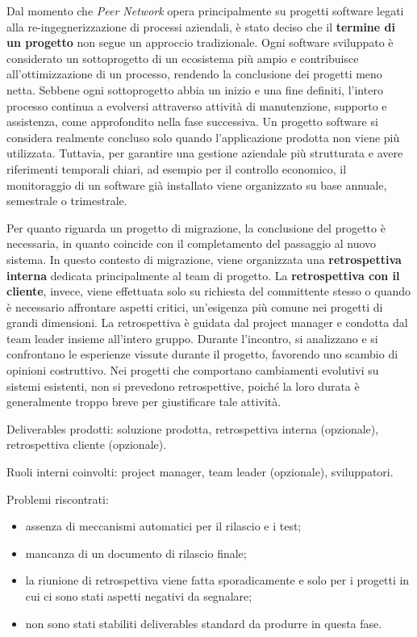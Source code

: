        Dal momento che \textit{Peer Network} opera principalmente su progetti software legati alla re-ingegnerizzazione di processi aziendali, è stato deciso che il \textbf{termine di un progetto}
        non segue un approccio tradizionale. Ogni software sviluppato è considerato un sottoprogetto di un ecosistema più ampio e contribuisce all’ottimizzazione
        di un processo, rendendo la conclusione dei progetti meno netta. Sebbene ogni sottoprogetto abbia un inizio e una fine definiti, l’intero
        processo continua a evolversi attraverso attività di manutenzione, supporto e assistenza, come approfondito nella fase successiva. Un progetto software
        si considera realmente concluso solo quando l'applicazione prodotta non viene più utilizzata. Tuttavia, per garantire una gestione aziendale più strutturata
        e avere riferimenti temporali chiari, ad esempio per il controllo economico, il monitoraggio di un software già installato viene organizzato
        su base annuale, semestrale o trimestrale.
        
        Per quanto riguarda un progetto di migrazione, la conclusione del progetto è necessaria, in quanto coincide con il completamento del passaggio al nuovo sistema.
        In questo contesto di migrazione, viene organizzata una \textbf{retrospettiva
        interna} dedicata principalmente al team di progetto. La \textbf{retrospettiva con il cliente}, invece, viene effettuata solo su richiesta del committente stesso o quando è
        necessario affrontare aspetti critici, un’esigenza più comune nei progetti di grandi dimensioni.
        La retrospettiva è guidata dal project manager e condotta dal team leader insieme all’intero gruppo. Durante l’incontro, si analizzano e si confrontano le esperienze
        vissute durante il progetto, favorendo uno scambio di opinioni costruttivo.
        Nei progetti che comportano cambiamenti evolutivi su sistemi esistenti, non si prevedono retrospettive, poiché la loro durata è generalmente troppo breve per giustificare tale attività.
        
        Deliverables prodotti: soluzione prodotta, retrospettiva interna (opzionale), retrospettiva cliente (opzionale).

        Ruoli interni coinvolti: project manager, team leader (opzionale), sviluppatori.

        Problemi riscontrati:
        \begin{itemize}
            \item assenza di meccanismi automatici per il rilascio e i test;
            \item mancanza di un documento di rilascio finale;
            \item la riunione di retrospettiva viene fatta sporadicamente e solo per i progetti in cui ci sono stati aspetti negativi da segnalare;
            \item non sono stati stabiliti deliverables standard da produrre in questa fase.
        \end{itemize}

